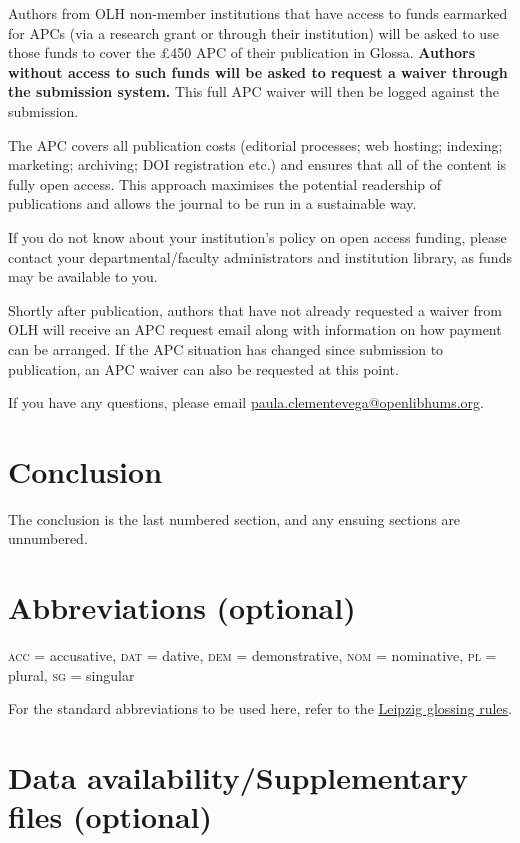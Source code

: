 \documentclass[charis,linguex]{glossa}
\begin{document}
Authors from OLH non-member institutions that have access to funds earmarked for APCs (via a research grant or through their institution) will be asked to use those funds to cover the £450 APC of their publication in Glossa. \textbf{Authors without access to such funds will be asked to request a waiver through the submission system.} This full APC waiver will then be logged against the submission.

The APC covers all publication costs (editorial processes; web hosting; indexing; marketing; archiving; DOI registration etc.) and ensures that all of the content is fully open access. This approach maximises the potential readership of publications and allows the journal to be run in a sustainable way.

If you do not know about your institution’s policy on open access funding, please contact your departmental/faculty administrators and institution library, as funds may be available to you.

Shortly after publication, authors that have not already requested a waiver from OLH will receive an APC request email along with information on how payment can be arranged. If the APC situation has changed since submission to publication, an APC waiver can also be requested at this point. 

If you have any questions, please email \href{mailto:paula.clementevega@openlibhums.org}{paula.clementevega@openlibhums.org}. 

\section{Conclusion}

The conclusion is the last numbered section, and any ensuing sections are unnumbered.

\section*{Abbreviations (optional)}\label{abbrev}

\textsc{acc} = accusative, \textsc{dat} = dative, \textsc{dem} = demonstrative, \textsc{nom} = nominative, \textsc{pl} = plural, \textsc{sg} = singular

For the standard abbreviations to be used here, refer to the \href{https://www.eva.mpg.de/lingua/resources/glossing-rules.php}{Leipzig glossing rules}. 

\section*{Data availability/Supplementary files (optional)}
\end{document}

